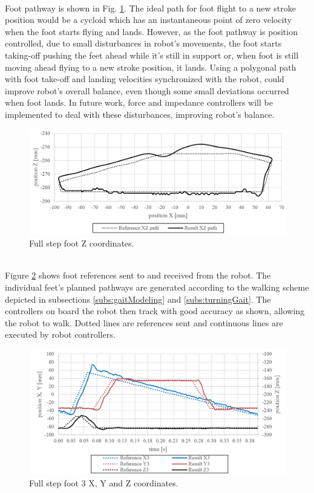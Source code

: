 \\Foot pathway is shown in Fig. \ref{fig:xz}. The ideal path for foot flight to a new stroke position would be a cycloid which has an instantaneous point of zero velocity when the foot starts flying and lands. However, as the foot pathway is position controlled, due to small disturbances in robot's movements, the foot starts taking-off  pushing the feet ahead while it's still in support or, when foot is still moving ahead flying to a new stroke position, it lands. Using a polygonal path with foot take-off and landing velocities synchronized with the robot, could improve robot's overall balance, even though some small deviations occurred when foot lands. In future work, force and impedance controllers will be implemented to deal with these disturbances, improving robot's balance.
\begin{figure}[htb!]
	\centering
	\includegraphics[width=1\linewidth]{./Figuras/XZ}
	\caption{Full step foot Z coordinates.}
	\label{fig:xz}
\end{figure}
\\Figure \ref{fig:xyz} shows foot references sent to and received from the robot. The individual feet's planned pathways are generated according to the walking scheme depicted in subsections \ref{subs:gaitModeling} and \ref{subs:turningGait}. The controllers on board the robot then track with good accuracy as shown, allowing the robot to walk. Dotted lines are references sent and continuous lines are executed by robot controllers. 
\begin{figure}[htb!]
	\centering
	\includegraphics[width=1\linewidth]{./Figuras/xyz}
	\caption{Full step foot 3 X, Y and Z coordinates.}
	\label{fig:xyz}
\end{figure}
